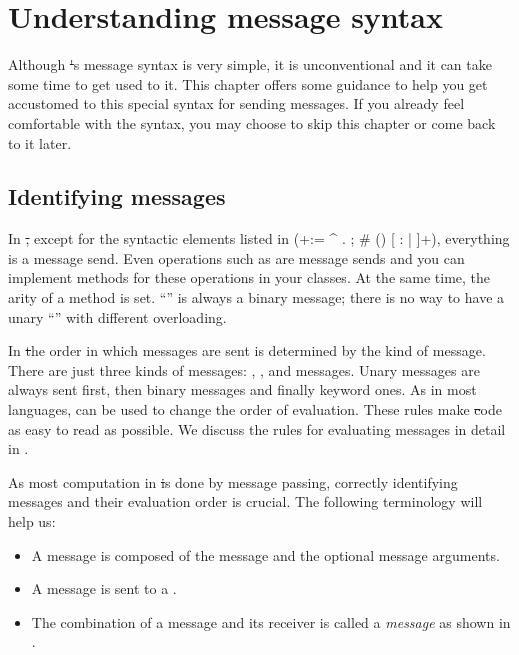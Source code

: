 \documentclass[a4paper,10pt,twoside]{book}
\begin{document}
	\renewcommand{\nnbb}[2]{} %
\fi
\chapter{Understanding message syntax}
\label{cha:understanding}

Although \st's message syntax is very simple, it is unconventional and it can take some time to get used to it.
This chapter offers some guidance to help you get accustomed to this special syntax for sending messages.
If you already feel comfortable with the syntax, you may choose to skip this chapter or come back to it later.

\section{Identifying messages}

In \st, except for the syntactic elements listed in  (\ct+:= ^ . ; # () {} [ : | ]+), everything is a message send.
Even operations such as \ct{+} are message sends and you can implement methods for these operations in your classes.
At the same time, the arity of a method is set.
``\ct{-}'' is always a binary message; there is no way to have a unary ``\ct{-}'' with different overloading.

In \st the order in which messages are sent is determined by the kind of message.
There are just three kinds of messages: , , and  messages.
Unary messages are always sent first, then binary messages and finally keyword ones.
As in most languages,  can be used to change the order of evaluation.
These rules make \st code as easy to read as possible.
We discuss the rules for evaluating messages in detail in .

As most computation in \st is done by message passing, correctly identifying messages and their evaluation order is crucial.
The following terminology will help us:
\begin{itemize}
  \item A message is composed of the message  and the optional message arguments.
  \item A message is sent to a .
  \item The combination of a message and its receiver is called a \emph{message}  as shown in .
\end{itemize}
\end{document}
